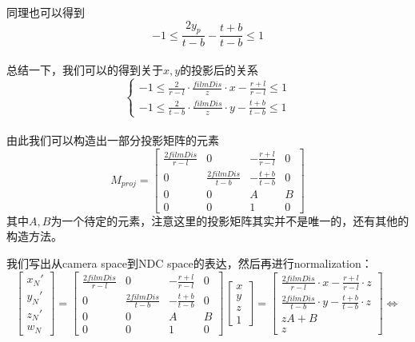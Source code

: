 同理也可以得到
\begin{displaymath}
-1 \leq \frac{2y_p}{t - b} - \frac{t + b}{t - b} \leq 1
\end{displaymath}
\\

总结一下，我们可以的得到关于$x, y$的投影后的关系
\begin{displaymath}
\left\{
\begin{gathered}
-1 \leq \frac{2}{r - l}\cdot\frac{filmDis}{z}\cdot x - \frac{r + l}{r - l} \leq 1\\
-1 \leq \frac{2}{t - b}\cdot\frac{filmDis}{z}\cdot y - \frac{t + b}{t - b} \leq 1
\end{gathered}
\right.
\end{displaymath}
\\

由此我们可以构造出一部分投影矩阵的元素
\begin{displaymath}
M_{proj} = 
\begin{bmatrix}
\frac{2filmDis}{r - l} & 0  & -\frac{r + l}{r - l} & 0\\
0 & \frac{2filmDis}{t - b} & -\frac{t + b}{t - b} & 0\\
0 & 0 & A & B\\
0 & 0 & 1 & 0
\end{bmatrix}
\end{displaymath}
其中$A, B$为一个待定的元素，注意这里的投影矩阵其实并不是唯一的，还有其他的构造方法。

我们写出从camera space到NDC space的表达，然后再进行normalization：
\begin{displaymath}
\begin{bmatrix}
x_N'\\
y_N'\\
z_N'\\
w_N
\end{bmatrix} = 
\begin{bmatrix}
\frac{2filmDis}{r - l} & 0 & -\frac{r + l}{r - l} & 0\\
0 & \frac{2filmDis}{t - b} & -\frac{t + b}{t - b} & 0\\
0 & 0 & A & B\\
0 & 0 & 1 & 0
\end{bmatrix}
\begin{bmatrix}
x\\
y\\
z\\
1
\end{bmatrix} =
\left[\begin{gathered}
\frac{2filmDis}{r - l}\cdot x - \frac{r + l}{r - l} \cdot z\\
\frac{2filmDis}{t - b} \cdot y - \frac{t + b}{t - b}\cdot z\\
zA + B\\
z
\end{gathered}\right]\Longleftrightarrow
\end{displaymath}

